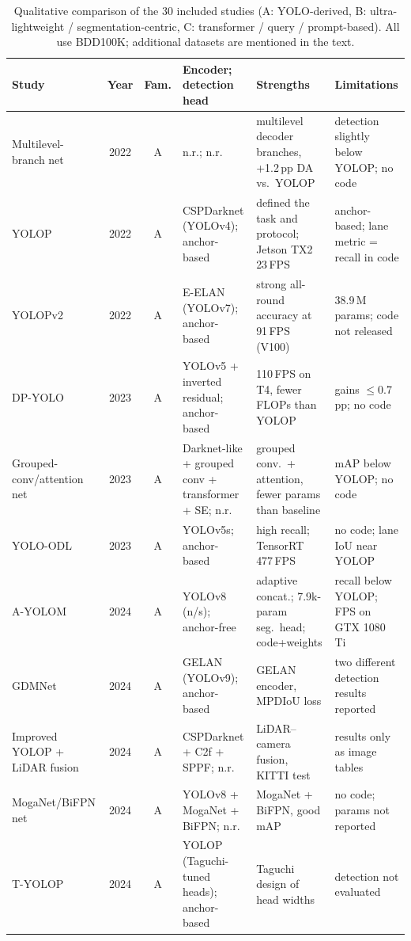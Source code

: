 \begin{table}[!htbp]
\centering
\caption{Qualitative comparison of the 30 included studies (A: YOLO-derived, B: ultra-lightweight / segmentation-centric, C: transformer / query / prompt-based). All use BDD100K; additional datasets are mentioned in the text.}
\label{tab:qual}
\scriptsize
\begin{tabularx}{\linewidth}{L{2.6cm} c c L{3.6cm} X X}
\toprule
Study & Year & Fam. & Encoder; detection head & Strengths & Limitations \\
\midrule
Multilevel-branch net~\cite{kim2022joint} & 2022 & A & n.r.; n.r. & multilevel decoder branches, +1.2\,pp DA vs.\ YOLOP & detection slightly below YOLOP; no code \\
YOLOP~\cite{wu2022yolop} & 2022 & A & CSPDarknet (YOLOv4); anchor-based & defined the task and protocol; Jetson TX2 23\,FPS & anchor-based; lane metric = recall in code \\
YOLOPv2~\cite{han2022yolopv2} & 2022 & A & E-ELAN (YOLOv7); anchor-based & strong all-round accuracy at 91\,FPS (V100) & 38.9\,M params; code not released \\
DP-YOLO~\cite{zeng2023dpyolo} & 2023 & A & YOLOv5 + inverted residual; anchor-based & 110\,FPS on T4, fewer FLOPs than YOLOP & gains $\le$0.7\,pp; no code \\
Grouped-conv/attention net~\cite{ma2023grouped} & 2023 & A & Darknet-like + grouped conv + transformer + SE; n.r. & grouped conv.\ + attention, fewer params than baseline & mAP below YOLOP; no code \\
YOLO-ODL~\cite{guo2023yoloodl} & 2023 & A & YOLOv5s; anchor-based & high recall; TensorRT 477\,FPS & no code; lane IoU near YOLOP \\
A-YOLOM~\cite{wang2024ayolom} & 2024 & A & YOLOv8 (n/s); anchor-free & adaptive concat.; 7.9k-param seg.\ head; code+weights & recall below YOLOP; FPS on GTX 1080 Ti \\
GDMNet~\cite{liu2024gdmnet} & 2024 & A & GELAN (YOLOv9); anchor-based & GELAN encoder, MPDIoU loss & two different detection results reported \\
Improved YOLOP + LiDAR fusion~\cite{liu2024fusion} & 2024 & A & CSPDarknet + C2f + SPPF; n.r. & LiDAR--camera fusion, KITTI test & results only as image tables \\
MogaNet/BiFPN net~\cite{li2024envperception} & 2024 & A & YOLOv8 + MogaNet + BiFPN; n.r. & MogaNet + BiFPN, good mAP & no code; params not reported \\
T-YOLOP~\cite{lin2024tyolop} & 2024 & A & YOLOP (Taguchi-tuned heads); anchor-based & Taguchi design of head widths & detection not evaluated \\

\end{tabularx}
\end{table}
